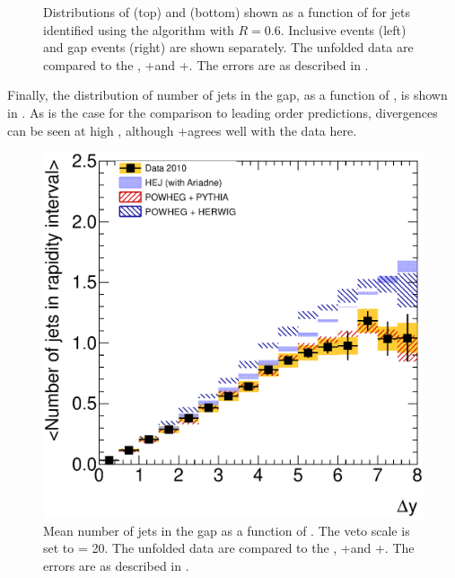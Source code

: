 \begin{figure}[htpb]
{    \label{fig:azimuthal-decorrelation:cosTwo_gap_theory}}
  \caption{Distributions of \meanCosDPhi (top) and \meanCosTwoDPhi (bottom) shown as a function
           of \DeltaY for jets identified using the \akt algorithm with $R=0.6$.
           Inclusive events (left) and gap events (right) are shown separately.
           The unfolded data are compared to the \HEJ, \Powheg+\Pythia and \Powheg+\Herwig.
           The errors are as described in .}
  \label{fig:azimuthal-decorrelation:cosDeltaPhi_theory}
\end{figure}

Finally, the distribution of number of jets in the gap, as a function of \DeltaY,
is shown in . As is the case
for the comparison to leading order \MC predictions, divergences can be seen at
high \DeltaY, although \Powheg+\Pythia agrees well with the data here.

\begin{figure}
  \includegraphics[width=\mediumfigwidth]{chapters/azimuthal-decorrelation/nGapJets_YDist.eps}
  \caption{Mean number of jets in the gap as a function of \DeltaY. The veto scale
           is set to \Qnought = \unit{20}{\GeV}. The unfolded data are compared
           to the \HEJ, \Powheg+\Pythia and \Powheg+\Herwig. The errors are as
           described in .}
  \label{fig:azimuthal-decorrelation:nGapJets_theory}
\end{figure}

